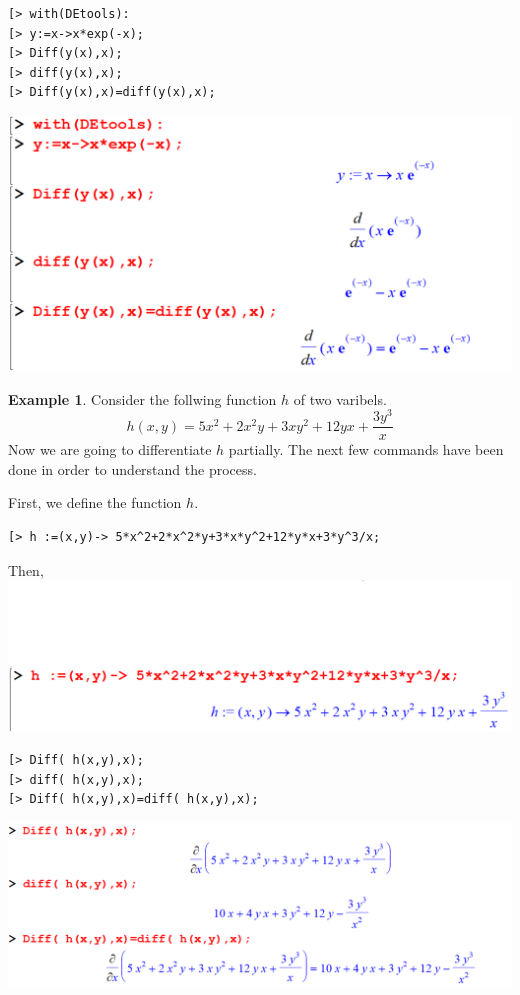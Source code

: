 \documentclass[
]{book}
\theoremstyle{definition}
\theoremstyle{definition}
\newtheorem{example}{Example}[chapter]
\theoremstyle{definition}
\theoremstyle{definition}
\theoremstyle{remark}
\begin{document}
\begin{verbatim}
[> with(DEtools):
[> y:=x->x*exp(-x);
[> Diff(y(x),x);
[> diff(y(x),x);
[> Diff(y(x),x)=diff(y(x),x);
\end{verbatim}

\includegraphics{figures/Diff/Diff 6.1 -1.png}

\begin{example}
\protect\hypertarget{exm:unnamed-chunk-25}{}\label{exm:unnamed-chunk-25}Consider the follwing function \(h\) of two varibels.
\[h(x,y)=5x^2 + 2x^2y + 3xy^2 + 12yx + \frac{3y^3}{x}\]
Now we are going to differentiate \(h\) partially. The next few
commands have been done in order to understand the process.
\end{example}

First, we define the function \(h\).

\begin{verbatim}
[> h :=(x,y)-> 5*x^2+2*x^2*y+3*x*y^2+12*y*x+3*y^3/x;
\end{verbatim}

Then,
\includegraphics{figures/Diff/Diff 6.1 -2.png}

\begin{verbatim}
[> Diff( h(x,y),x);
[> diff( h(x,y),x);
[> Diff( h(x,y),x)=diff( h(x,y),x);
\end{verbatim}

\includegraphics{figures/Diff/Diff 6.1 -3.png}
\end{document}
